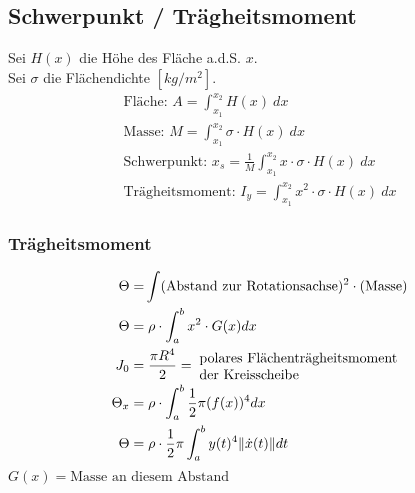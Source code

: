 \subsection{Schwerpunkt / Trägheitsmoment}
    Sei $H(x)$ die Höhe des Fläche a.d.S. $x$.\\
    Sei $\sigma$ die Flächendichte $[kg/m^2]$.
    \begin{align*}
        \textrm{Fläche: }  A = \int_{x_1}^{x_2} H(x)\ dx\\
        \textrm{Masse: }  M = \int_{x_1}^{x_2} \sigma \cdot H(x)\ dx\\
        \textrm{Schwerpunkt: }  x_s = \frac{1}{M} \int_{x_1}^{x_2} x \cdot \sigma \cdot H(x)\ dx\\
        \textrm{Trägheitsmoment: }  I_y = \int_{x_1}^{x_2} x^2 \cdot \sigma \cdot H(x)\ dx
    \end{align*}
    \subsubsection{Trägheitsmoment}
    \vspace*{-1em}
        \begin{align*}
            \Theta =& \int (\textrm{Abstand zur Rotationsachse})^2 \cdot (\textrm{Masse})\\
            \Theta =& \; \rho \cdot \int_a^b x^2 \cdot G(x) dx\\
            J_0 =& \; \frac{\pi R^4}{2} = \; \parbox{5cm}{polares Flächenträgheitsmoment\\ der Kreisscheibe}\\
            \Theta_x =& \; \rho \cdot \int_a^b \frac{1}{2} \pi (f(x))^4 dx\\
            \Theta =& \; \rho \cdot \frac{1}{2} \pi \int_a^{b} y(t)^4\|\dot{x}(t)\| dt
        \end{align*}
        $G(x) = \text{Masse an diesem Abstand}$